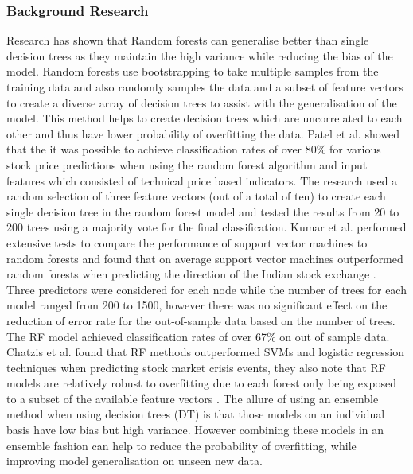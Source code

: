 \documentclass[11pt, a4paper]{article}
\begin{document}
\subsubsection{Background Research}
Research has shown that Random forests can generalise better than single decision trees as they maintain the high variance while reducing the bias of the model\cite{Genuer2012}.
 Random forests use bootstrapping to take multiple samples from the training data and also randomly samples the data and a subset of feature vectors to create a diverse array of decision trees to assist with the generalisation of the model. This method helps to create decision trees which are uncorrelated to each other and thus have lower probability of overfitting the data. Patel et al. showed that the it was possible to achieve classification rates of over 80\% for various stock price predictions when using the random forest algorithm and input features which consisted of technical price based indicators\cite{Patel2015}. The research used a random selection of three feature vectors (out of a total of ten) to create each single decision tree in the random forest model and tested the results from 20 to 200 trees using a majority vote for the final classification.  \newline
Kumar et al. performed extensive tests to compare the performance of support vector machines to random forests and found that on average support vector machines outperformed random forests when predicting the direction of the Indian stock exchange \cite{Kumar2006}. Three predictors were considered for each node while the number of trees for each model ranged from 200 to 1500, however there was no significant effect on the reduction of error rate for the out-of-sample data based on the number of trees. The RF model achieved classification rates of over 67\% on out of sample data.\newline
Chatzis et al. found that RF methods outperformed SVMs and logistic regression techniques when predicting stock market crisis events, they also note that RF models are relatively robust to overfitting due to each forest only being exposed to a subset of the available feature vectors \cite{Chatzis}.
The allure of using an ensemble method when using decision trees (DT) is that those models on an individual basis have low bias but high variance. However combining these models in an ensemble fashion can help to reduce the probability of overfitting, while improving model generalisation on unseen new data.
 
\end{document}
